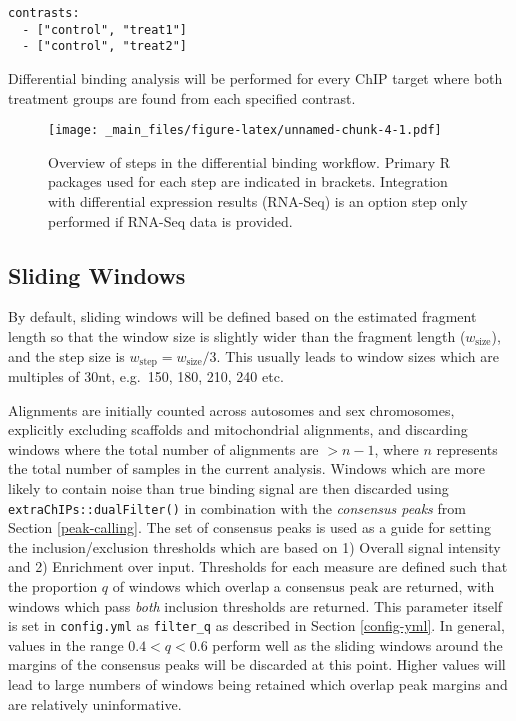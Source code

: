 \documentclass[
]{book}
\begin{document}
\begin{verbatim}
contrasts:
  - ["control", "treat1"]
  - ["control", "treat2"]
\end{verbatim}

Differential binding analysis will be performed for every ChIP target where both treatment groups are found from each specified contrast.

\begin{figure}
\centering
\texttt{[image: \_main\_files/figure-latex/unnamed-chunk-4-1.pdf]}
\caption{\label{fig:unnamed-chunk-4}Overview of steps in the differential binding workflow. Primary R packages used for each step are indicated in brackets. Integration with differential expression results (RNA-Seq) is an option step only performed if RNA-Seq data is provided.}
\end{figure}

\hypertarget{sliding-windows}{%
\subsection*{Sliding Windows}\label{sliding-windows}}

By default, sliding windows will be defined based on the estimated fragment length so that the window size is slightly wider than the fragment length (\(w_\text{size}\)), and the step size is \(w_\text{step} = w_\text{size} / 3\).
This usually leads to window sizes which are multiples of 30nt, e.g.~150, 180, 210, 240 etc.

Alignments are initially counted across autosomes and sex chromosomes, explicitly excluding scaffolds and mitochondrial alignments, and discarding windows where the total number of alignments are \(>n-1\), where \(n\) represents the total number of samples in the current analysis.
Windows which are more likely to contain noise than true binding signal are then discarded using \texttt{extraChIPs::dualFilter()} in combination with the \emph{consensus peaks} from Section \ref{peak-calling}.
The set of consensus peaks is used as a guide for setting the inclusion/exclusion thresholds which are based on 1) Overall signal intensity and 2) Enrichment over input.
Thresholds for each measure are defined such that the proportion \(q\) of windows which overlap a consensus peak are returned, with windows which pass \emph{both} inclusion thresholds are returned.
This parameter itself is set in \texttt{config.yml} as \texttt{filter\_q} as described in Section \ref{config-yml}.
In general, values in the range \(0.4 < q < 0.6\) perform well as the sliding windows around the margins of the consensus peaks will be discarded at this point.
Higher values will lead to large numbers of windows being retained which overlap peak margins and are relatively uninformative.
\end{document}
